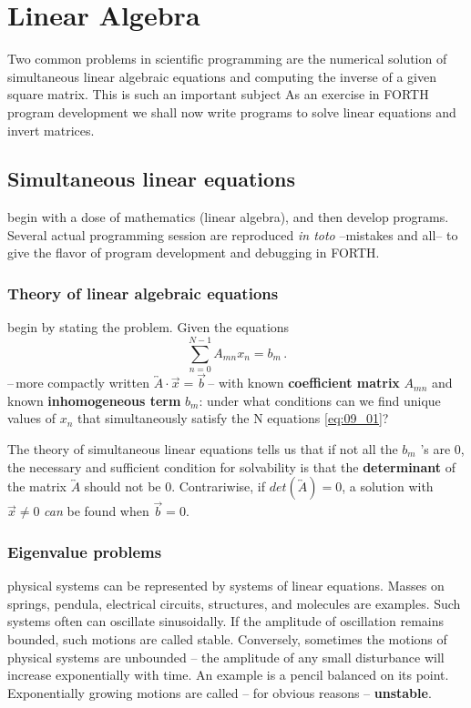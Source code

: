  
\chapter{Linear Algebra}

Two common problems in scientific programming are the
numerical solution of simultaneous linear algebraic equations
and computing the inverse of a given square matrix. This is such
an important subject As an exercise in FORTH program
development we shall now write programs to solve linear equations and invert matrices.

\section{Simultaneous linear equations}
 begin with a dose of mathematics (linear algebra), and 
then develop programs. Several actual programming session
are reproduced \textit{in toto} --mistakes and all-- to give the flavor of
program development and debugging in FORTH.
\subsection{Theory of linear algebraic equations}
 begin by stating the problem. Given the equations
\begin{equation}
    \sum_{n=0}^{N-1}A_{mn}x_n=b_m \,. \label{eq:09_01}
\end{equation}
--\,more compactly written $\overleftrightarrow{A} \cdot \vec{x} = \vec{b}$\,--
with known \textbf{coefficient
matrix} $A_{mn}$ and known \textbf{inhomogeneous term} $b_m$: under what
conditions can we find unique values of $x_n$ that simultaneously
satisfy the N equations \ref{eq:09_01}?

The theory of simultaneous linear equations tells us that if not all
the $b_m$ 's are 0, the necessary and sufficient condition for solvability is that the \textbf{determinant} of the matrix $\overleftrightarrow{A}$ should not be 0.
Contrariwise, if $det(\overleftrightarrow{A} )= 0$, a solution with $\vec{x} \neq 0 $ \textit{can} be found
when $\vec{b}= 0$.

\subsection{Eigenvalue problems} 
 physical systems can be represented by systems of linear 
equations. Masses on springs, pendula, electrical circuits,
structures, and molecules are examples. Such systems often can
oscillate sinusoidally. If the amplitude of oscillation remains
bounded, such motions are called stable. Conversely, sometimes
the motions of physical systems are unbounded -- the amplitude
of any small disturbance will increase exponentially with time. An
example is a pencil balanced on its point. Exponentially growing
motions are called -- for obvious reasons -- \textbf{unstable}.


